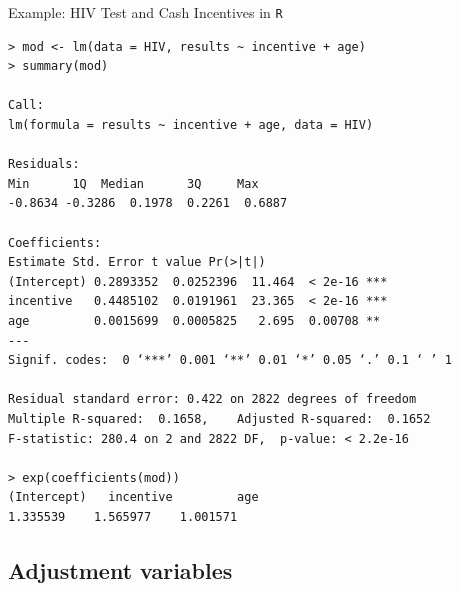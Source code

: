\documentclass[10pt,t]{beamer}
\begin{document}
\begin{frame}[fragile]{Example: HIV Test and Cash Incentives in \texttt{R}}
	
	\vspace{-8 mm}
	
\scriptsize
\begin{verbatim}
> mod <- lm(data = HIV, results ~ incentive + age)
> summary(mod)

Call:
lm(formula = results ~ incentive + age, data = HIV)

Residuals:
Min      1Q  Median      3Q     Max 
-0.8634 -0.3286  0.1978  0.2261  0.6887 

Coefficients:
Estimate Std. Error t value Pr(>|t|)    
(Intercept) 0.2893352  0.0252396  11.464  < 2e-16 ***
incentive   0.4485102  0.0191961  23.365  < 2e-16 ***
age         0.0015699  0.0005825   2.695  0.00708 ** 
---
Signif. codes:  0 ‘***’ 0.001 ‘**’ 0.01 ‘*’ 0.05 ‘.’ 0.1 ‘ ’ 1

Residual standard error: 0.422 on 2822 degrees of freedom
Multiple R-squared:  0.1658,	Adjusted R-squared:  0.1652 
F-statistic: 280.4 on 2 and 2822 DF,  p-value: < 2.2e-16

> exp(coefficients(mod))
(Intercept)   incentive         age 
1.335539    1.565977    1.001571
\end{verbatim}
\end{frame}
\subsection{Adjustment variables}
\end{document}
